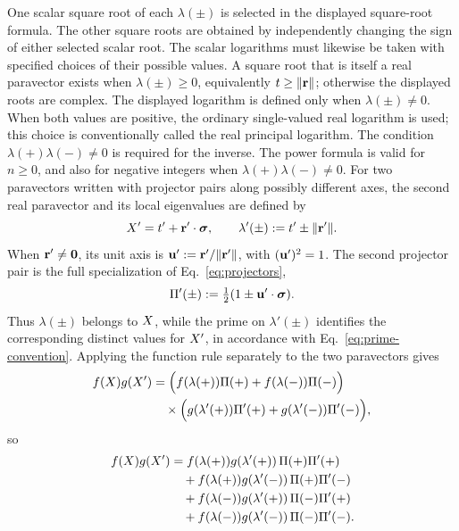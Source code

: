 One scalar square root of each \(\lambda(\pm)\) is selected in the displayed
square-root formula. The other square roots are obtained by independently
changing the sign of either selected scalar root. The scalar logarithms must
likewise be taken with specified choices of their possible values. A square
root that is itself a real paravector exists when
\(\lambda(\pm)\geq0\), equivalently
\(t\geq\lVert\mathbf{r}\rVert\); otherwise the
displayed roots are complex. The displayed logarithm is defined only when
\(\lambda(\pm)\neq0\). When both values are positive, the ordinary
single-valued real logarithm is
used; this choice is conventionally called the real principal logarithm.
The condition
\(\lambda(+)\lambda(-)\neq0\) is required for the inverse.
The power formula is valid for
\(n\geq0\), and also for negative integers when
\(\lambda(+)\lambda(-)\neq0\).
For two paravectors written with projector pairs along possibly different
axes, the second real paravector and its local eigenvalues are defined by
\begin{equation}
X'=t'+\mathbf{r}'\cdot\mathbf{\bm{\sigma}},
\qquad
\lambda'(\pm):=t'\pm\lVert\mathbf{r}'\rVert.
\label{eq:second-real-paravector-eigenvalues}
\end{equation}
When \(\mathbf{r}'\neq\mathbf{0}\), its unit axis is
\(\mathbf{u}':=\mathbf{r}'/\lVert\mathbf{r}'\rVert\), with
\((\mathbf{u}')^2=1\). The second projector pair is
the full specialization of Eq.\ \eqref{eq:projectors},
\begin{equation}
\Pi'(\pm):=\tfrac12(1\pm\mathbf{u}'\cdot\mathbf{\bm{\sigma}}).
\label{eq:second-axis-projectors}
\end{equation}
Thus \(\lambda(\pm)\) belongs to \(X\), while
the prime on \(\lambda'(\pm)\) identifies the corresponding distinct values
for \(X'\), in accordance with Eq.\ \eqref{eq:prime-convention}.
Applying the function rule separately to the two paravectors gives
\begin{align*}
f(X)g(X')
&=\Bigl(f(\lambda(+))\Pi(+)
+f(\lambda(-))\Pi(-)\Bigr)\notag\\
&\quad\times\Bigl(g(\lambda'(+))\Pi'(+)
+g(\lambda'(-))\Pi'(-)\Bigr),
\end{align*}
so
\begin{align*}
f(X)g(X')
&=f(\lambda(+))g(\lambda'(+))
\,\Pi(+)\Pi'(+)\notag\\
&\quad+f(\lambda(+))g(\lambda'(-))
\,\Pi(+)\Pi'(-)\notag\\
&\quad+f(\lambda(-))g(\lambda'(+))
\,\Pi(-)\Pi'(+)\notag\\
&\quad+f(\lambda(-))g(\lambda'(-))
\,\Pi(-)\Pi'(-).
\end{align*}
